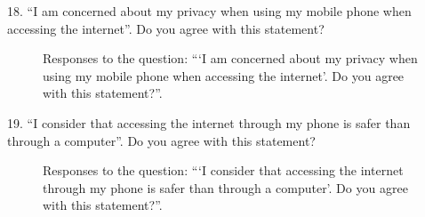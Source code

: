 18. ``I am concerned about my privacy when using my mobile phone when accessing the internet''. Do you agree with this statement?

\begin{figure}[H]
    \begin{center}
        \caption{Responses to the question: ```I am concerned about my privacy when using my mobile phone when accessing the internet'. Do you agree with this statement?''.}
        \label{fig:survey_s1_q18}
    \end{center}
\end{figure}

19. ``I consider that accessing the internet through my phone is safer than through a computer''. Do you agree with this statement?

\begin{figure}[H]
    \begin{center}
        \caption{Responses to the question: ```I consider that accessing the internet through my phone is safer than through a computer'. Do you agree with this statement?''.}
        \label{fig:survey_s1_q19}
    \end{center}
\end{figure}


